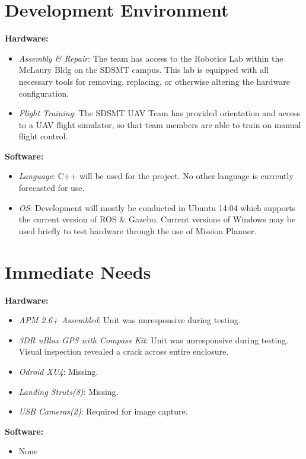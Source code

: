 \documentclass[11pt]{article}
\begin{document}
\section*{Development Environment}
\textbf{Hardware:}
\begin{itemize}
\item \textit{Assembly \& Repair}: The team has access to the Robotics Lab within the McLaury Bldg on the SDSMT campus. This lab is equipped with all necessary tools for removing, replacing, or otherwise altering the hardware configuration.
\item \textit{Flight Training}: The SDSMT UAV Team has provided orientation and access to a UAV flight simulator, so that team members are able to train on manual flight control.
\end{itemize}

\noindent \textbf{Software:}
\begin{itemize}
\item \textit{Language}: C++ will be used for the project. No other language is currently forecasted for use.
\item \textit{OS}: Development will mostly be conducted in Ubuntu 14.04 which supports the current version of ROS \& Gazebo. Current versions of Windows may be used briefly to test hardware through the use of Mission Planner.
\end{itemize}

\section*{Immediate Needs}

\textbf{Hardware:}
\begin{itemize}
\item \textit{APM 2.6+ Assembled}: Unit was unresponsive during testing.
\item \textit{3DR uBlox GPS with Compass Kit}: Unit was unresponsive during testing. Visual inspection revealed a crack across entire enclosure.
\item \textit{Odroid XU4}: Missing.
\item \textit{Landing Struts(8)}: Missing.
\item \textit{USB Cameras(2)}: Required for image capture.
\end{itemize}

\noindent \textbf{Software:}
\begin{itemize}
\item None
\end{itemize}
\end{document}

